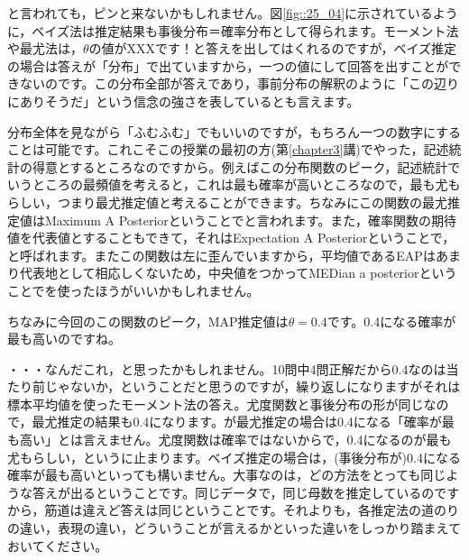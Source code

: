 \documentclass{ltjsarticle}
\begin{document}
と言われても，ピンと来ないかもしれません。図\ref{fig::25_04}に示されているように，ベイズ法は推定結果も事後分布＝確率分布として得られます。モーメント法や最尤法は，$\theta$の値がXXXです！と答えを出してはくれるのですが，ベイズ推定の場合は答えが「分布」で出ていますから，一つの値にして回答を出すことができないのです。この分布全部が答えであり，事前分布の解釈のように「この辺りにありそうだ」という信念の強さを表しているとも言えます。

分布全体を見ながら「ふむふむ」でもいいのですが，もちろん一つの数字にすることは可能です。これこそこの授業の最初の方(第\ref{chapter3}講)でやった，記述統計の得意とするところなのですから。例えばこの分布関数のピーク，記述統計でいうところの最頻値を考えると，これは最も確率が高いところなので，最も尤もらしい，つまり最尤推定値と考えることができます。ちなみにこの関数の最尤推定値はMaximum A Posteriorということでと言われます。また，確率関数の期待値を代表値とすることもできて，それはExpectation A Posteriorということで，と呼ばれます。またこの関数は左に歪んでいますから，平均値であるEAPはあまり代表地として相応しくないため，中央値をつかってMEDian a posteriorということでを使ったほうがいいかもしれません。

ちなみに今回のこの関数のピーク，MAP推定値は$\theta=0.4$です。0.4になる確率が最も高いのですね。


・・・なんだこれ，と思ったかもしれません。10問中4問正解だから0.4なのは当たり前じゃないか，ということだと思うのですが，繰り返しになりますがそれは標本平均値を使ったモーメント法の答え。尤度関数と事後分布の形が同じなので，最尤推定の結果も0.4になります。が最尤推定の場合は0.4になる「確率が最も高い」とは言えません。尤度関数は確率ではないからで，0.4になるのが最も尤もらしい，というに止まります。ベイズ推定の場合は，(事後分布が)0.4になる確率が最も高いといっても構いません。大事なのは，どの方法をとっても同じような答えが出るということです。同じデータで，同じ母数を推定しているのですから，筋道は違えど答えは同じということです。それよりも，各推定法の道のりの違い，表現の違い，どういうことが言えるかといった違いをしっかり踏まえておいてください。
\end{document}
